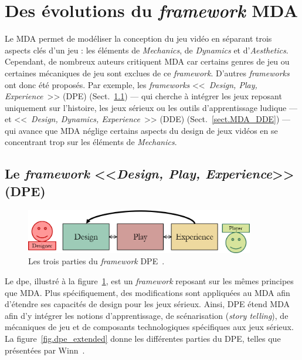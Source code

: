 \section{Des évolutions du \emph{framework} MDA}

Le MDA permet de modéliser la conception du jeu vidéo en séparant trois aspects cl\'es d'un jeu : les éléments de \emph{Mechanics}, de \emph{Dynamics} et d'\emph{Aesthetics}.
Cependant, de nombreux auteurs critiquent MDA car certains genres de jeu ou certaines mécaniques de jeu sont exclues de ce \emph{framework}.
%
D'autres \emph{frameworks} ont donc été proposés.
%
Par exemple, les \emph{frameworks} <<~\emph{Design, Play, Experience}~>> (DPE) (Sect.~\ref{sect.MDA_DPE}) --- qui cherche à intégrer les jeux reposant uniquement sur l'histoire, les jeux sérieux ou les outils d'apprentissage ludique ---
%
et <<~\emph{Design, Dynamics, Experience}~>> (DDE) (Sect.~\ref{sect.MDA_DDE}) --- qui avance que MDA néglige certains aspects du design de jeux vidéos en se concentrant trop sur les éléments de \emph{Mechanics}.



\subsection{Le \emph{framework} <<\emph{Design, Play, Experience}>> (DPE)}
\label{sect.MDA_DPE}

\begin{figure}[H]
    \centering
    \includegraphics[width=10cm]{10_img/chap3/dpe.png} 
    \caption{Les trois parties du \emph{framework} DPE~\cite{Winn2011}.}
    \label{fig.dpe}
\end{figure}

Le \gls{dpe}, illustr\'e \`a la figure~\ref{fig.dpe}, est un \emph{framework} reposant sur les mêmes principes que MDA. 
Plus sp\'ecifiquement, des modifications sont appliquées au MDA afin d'étendre ses capacités de design pour les jeux sérieux. 
Ainsi, DPE étend MDA afin d'y intégrer les notions d'apprentissage, de sc\'enarisation (\emph{story telling}), de mécaniques de jeu et de composants technologiques spécifiques aux jeux sérieux. 
La figure~\ref{fig.dpe_extended} donne les différentes parties du DPE, telles que présentées par Winn~\cite{Winn2011}.


